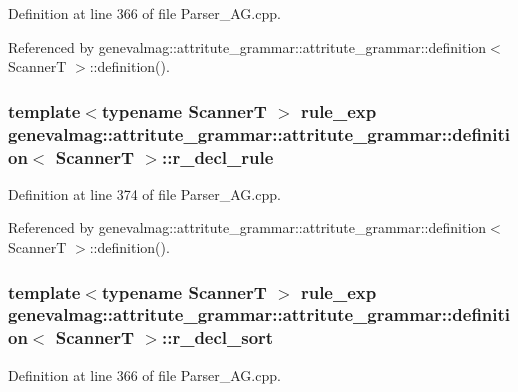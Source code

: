 Definition at line 366 of file Parser\_\-AG.cpp.

Referenced by genevalmag::attritute\_\-grammar::attritute\_\-grammar::definition$<$ ScannerT $>$::definition().\hypertarget{structgenevalmag_1_1attritute__grammar_1_1definition_2fa2fb37ad5fda235746ef13e6308384}{
\subsubsection[{r\_\-decl\_\-rule}]{\setlength{\rightskip}{0pt plus 5cm}template$<$typename ScannerT $>$ {\bf rule\_\-exp} genevalmag::attritute\_\-grammar::attritute\_\-grammar::definition$<$ ScannerT $>$::{\bf r\_\-decl\_\-rule}}}
\label{structgenevalmag_1_1attritute__grammar_1_1definition_2fa2fb37ad5fda235746ef13e6308384}




Definition at line 374 of file Parser\_\-AG.cpp.

Referenced by genevalmag::attritute\_\-grammar::attritute\_\-grammar::definition$<$ ScannerT $>$::definition().\hypertarget{structgenevalmag_1_1attritute__grammar_1_1definition_65a52ea61b7e3c0319f0cf76900ba470}{
\subsubsection[{r\_\-decl\_\-sort}]{\setlength{\rightskip}{0pt plus 5cm}template$<$typename ScannerT $>$ {\bf rule\_\-exp} genevalmag::attritute\_\-grammar::attritute\_\-grammar::definition$<$ ScannerT $>$::{\bf r\_\-decl\_\-sort}}}
\label{structgenevalmag_1_1attritute__grammar_1_1definition_65a52ea61b7e3c0319f0cf76900ba470}




Definition at line 366 of file Parser\_\-AG.cpp.

